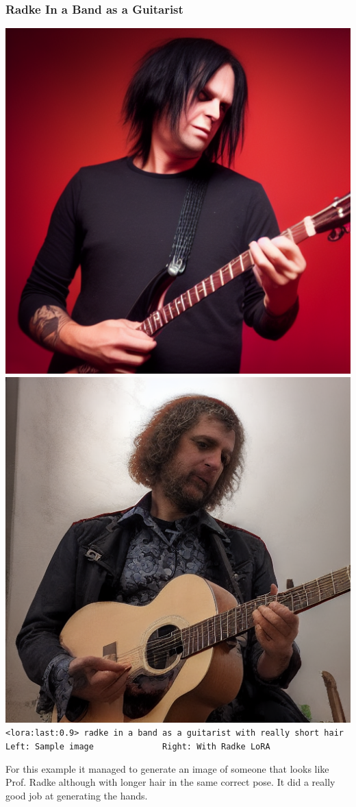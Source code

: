 \documentclass{article}
\begin{document}
\subsubsection{Radke In a Band as a Guitarist}
\begin{center}
    \includegraphics[scale=0.3]{.imgs/guitar_base.png}
    \includegraphics[scale=0.3]{.imgs/radke_lora_v1.5_(2)_prompting_guitar_1.png}
    \verb|<lora:last:0.9> radke in a band as a guitarist with really short hair|
    \verb|Left: Sample image              Right: With Radke LoRA|
\end{center}
For this example it managed to generate an image of someone that looks like Prof. Radke although with longer hair in the same correct pose. It did a really good job at generating the hands.
\end{document}

